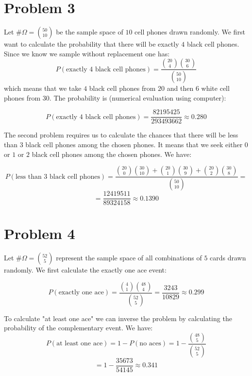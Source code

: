 \documentclass{article}
\begin{document}
\section*{Problem 3}
Let \(\# \Omega = \binom{50}{10}\) be the sample space of \(10\) cell phones drawn randomly.
We first want to calculate the probability that there will be exactly \(4\) black cell phones.
Since we know we sample without replacement one has:
\begin{equation*}
    P(\mbox{exactly 4 black cell phones}) = \frac{\binom{20}{4}\binom{30}{6}}{\binom{50}{10}}
\end{equation*}
which means that we take \(4\) black cell phones from \(20\) and then \(6\) white cell phones from
\(30\). The probability is (numerical evaluation using computer):

\begin{equation*}
    P(\mbox{exactly 4 black cell phones}) = \frac{82195425}{293493662} \approx 0.280
\end{equation*}

The second problem requires us to calculate the chances that 
there will be less than 3 black cell phones among the chosen phones. It means that
we seek either \(0\) or \(1\) or \(2\) black cell phones among the chosen phones. We have:

\begin{equation*}
    P(\mbox{less than 3 black cell phones}) = \frac{\binom{20}{0}\binom{30}{10} + \binom{20}{1}\binom{30}{9} + 
\binom{20}{2}\binom{30}{8}}{\binom{50}{10}} =
\end{equation*}
\begin{equation*}
    = \frac{12419511}{89324158} \approx 0.1390
\end{equation*}

\section*{Problem 4}

Let \(\# \Omega = \binom{52}{5}\) represent the sample space of all combinations of \(5\) cards drawn randomly.
We first calculate the exactly one ace event:

\begin{equation*}
    P(\mbox{exactly one ace}) = \frac{\binom{4}{1}\binom{48}{4}}{\binom{52}{5}} = \frac{3243}{10829} \approx 0.299
\end{equation*}

To calculate "at least one ace" we can inverse the problem by calculating the probability of the complementary event. We have:
\begin{equation*}
    P(\mbox{at least one ace}) = 1 - P(\mbox{no aces}) = 1 - \frac{\binom{48}{5}}{\binom{52}{5}}
\end{equation*}
\begin{equation*}
    = 1 - \frac{35673}{54145} \approx 0.341
\end{equation*}
\end{document}

